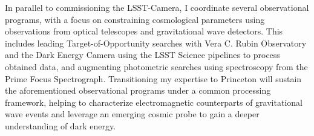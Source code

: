 \documentclass[10pt]{article}
\begin{document}

In parallel to commissioning the LSST-Camera, I coordinate several observational programs, with a focus on constraining cosmological parameters using observations from optical telescopes and gravitational wave detectors. This includes leading Target-of-Opportunity searches with Vera C. Rubin Observatory and the Dark Energy Camera using the LSST Science pipelines to process obtained data, and augmenting photometric searches using spectroscopy from the Prime Focus Spectrograph. 
\textcolor{\tcolor}{Transitioning my expertise to Princeton will sustain the aforementioned observational programs under a common processing framework, helping to characterize electromagnetic counterparts of gravitational wave events and leverage an emerging cosmic probe to gain a deeper understanding of dark energy.} 

\end{document}

